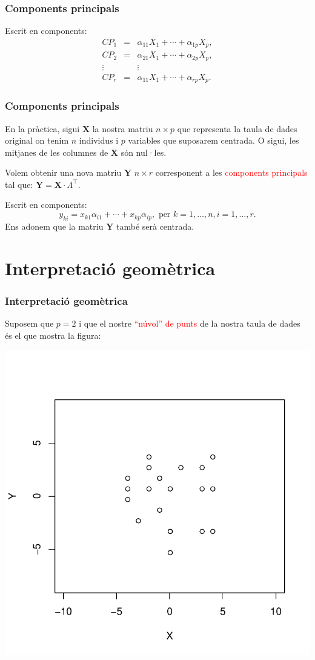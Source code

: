 \documentclass[12pt,t]{beamer}
\newcommand{\red}[1]{\textcolor{red}{#1}}
\theoremstyle{plain}
\theoremstyle{definition}
\begin{document}
\begin{frame}
\frametitle{Components principals}
Escrit en components:
\begin{eqnarray*}
CP_1 &=& \alpha_{11} X_1+\cdots + \alpha_{1p} X_p, \\
CP_2 &=& \alpha_{21} X_1+\cdots + \alpha_{2p} X_p, \\
\vdots && \vdots \\
CP_r &=& \alpha_{11} X_1+\cdots + \alpha_{rp} X_p.
\end{eqnarray*}
\end{frame}

\begin{frame}
\frametitle{Components principals}
En la pràctica, sigui $\mathbf{X}$ la nostra matriu $n\times p$ que representa la taula de dades original on tenim $n$ 
individus i $p$ variables que suposarem centrada. O sigui, les mitjanes de les columnes de $\mathbf{X}$ són nul·les.
\bigskip

Volem obtenir una nova matriu $\mathbf{Y}$ $n\times r$ corresponent a les \red{components principals} tal que: 
$\mathbf{Y}=\mathbf{X}\cdot \Lambda^\top.$
\medskip

Escrit en components:
\[
y_{ki}=x_{k1} \alpha_{i1}+\cdots +x_{kp}\alpha_{ip},\mbox{ per } k=1,\ldots,n,i=1,\ldots, r.
\]
Ens adonem que la matriu $\mathbf{Y}$ també serà centrada.
\end{frame}

\section{Interpretació geomètrica}

\begin{frame}[fragile]
\frametitle{Interpretació geomètrica}
Suposem que $p=2$ i que el nostre \red{``núvol'' de punts} de la nostra taula de dades és el que mostra la figura:
\vspace*{-1cm}

\includegraphics{ACP2print-001}
\end{frame}
\end{document}
